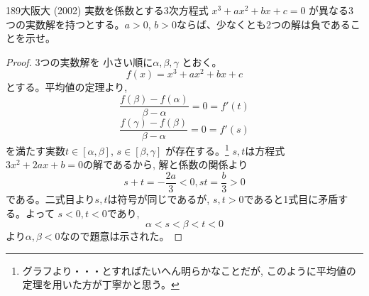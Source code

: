 \begin{prob}{189}{}{大阪大 (2002)}
 実数を係数とする3次方程式 $x^3+ax^2+bx+c=0$ が異なる3つの実数解を持つとする。$a>0$, $b>0$ならば、少なくとも2つの解は負であることを示せ。
\end{prob}
\begin{proof}
3つの実数解を 小さい順に$\alpha, \beta ,\gamma$ とおく。
\[f(x)=x^3+ax^2+bx+c\]
とする。平均値の定理より, 
\[\dfrac{f(\beta) -f(\alpha)}{\beta -\alpha}=0=f'(t) \]
\[\dfrac{f(\gamma) -f(\beta)}{\beta -\alpha}=0=f'(s) \]
を満たす実数$t\in [\alpha, \beta]$, $s\in [\beta , \gamma]$ が存在する。\footnote{グラフより・・・とすればたいへん明らかなことだが, このように平均値の定理を用いた方が丁寧かと思う。}
$s,t$は方程式 $3x^2 + 2ax +b=0$の解であるから, 解と係数の関係より
\[s+t=-\dfrac{2a}{3}<0,　　st=\dfrac{b}{3}>0\]
である。二式目より$s, t$は符号が同じであるが, $s,t>0$であると1式目に矛盾する。よって $s<0 , t<0$であり, 
\[\alpha< s< \beta < t<0\]
より$\alpha,\beta <0$なので題意は示された。%
\end{proof}